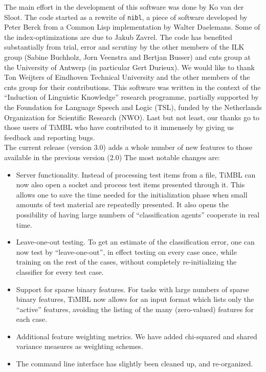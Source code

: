 \documentclass{report}
\begin{document}
The main effort in the development of this software was done by Ko van
der Sloot. The code started as a rewrite of {\tt nibl}, a piece of
software developed by Peter Berck from a Common Lisp implementation by
Walter Daelemans. Some of the index-optimizations are due to Jakub
Zavrel. The code has benefited substantially from trial, error and
scrutiny by the other members of the ILK group (Sabine Buchholz, Jorn
Veenstra and Bertjan Busser) and {\sc cnts} group at the University of
Antwerp (in particular Gert Durieux). We would like to thank Ton
Weijters of Eindhoven Technical University and the other members of
the {\sc cnts} group for their contributions. This software was
written in the context of the ``Induction of Linguistic Knowledge''
research programme, partially supported by the Foundation for Language
Speech and Logic (TSL), funded by the Netherlands Organization for
Scientific Research (NWO). Last but not least, our thanks go to those
users of TiMBL who have contributed to it immensely by giving us
feedback and reporting bugs.\\

The current release (version 3.0) adds a whole number of new features
to those available in the previous version (2.0) The most notable
changes are:

\begin{itemize}

\item Server functionality. Instead of processing test items from a
file, TiMBL can now also open a socket and process test items
presented through it. This allows one to save the time needed for the
initialization phase when small amounts of test material are
repeatedly presented. It also opens the possibility of having large
numbers of ``classification agents'' cooperate in real time.

\item Leave-one-out testing. To get an estimate of the classification
error, one can now test by ``leave-one-out'', in effect testing on
every case once, while training on the rest of the cases, without
completely re-initializing the classifier for every test case.

\item Support for sparse binary features. For tasks with large numbers
of sparse binary features, TiMBL now allows for an input format which
lists only the ``active'' features, avoiding the listing of the many
(zero-valued) features for each case.

\item Additional feature weighting metrics. We have added chi-squared
and shared variance measures as weighting schemes.

\item The command line interface has slightly been cleaned up, and
re-organized.

\end{itemize}
\end{document}
